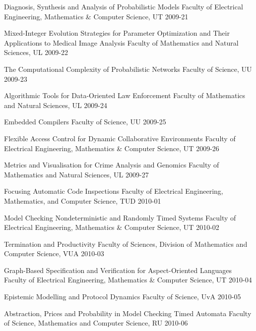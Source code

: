 \begin{multicols}{2}
         {Diagnosis, Synthesis and Analysis of Probabilistic Models}
         {Faculty of Electrical Engineering, Mathematics \& Computer Science, UT}
         {2009-21}

         {Mixed-Integer Evolution Strategies for Parameter Optimization and Their Applications to Medical Image Analysis}
         {Faculty of Mathematics and Natural Sciences, UL}
         {2009-22}

         {The Computational Complexity of Probabilistic Networks}
         {Faculty of Science, UU}
         {2009-23}

         {Algorithmic Tools for Data-Oriented Law Enforcement}
         {Faculty of Mathematics and Natural Sciences, UL}
         {2009-24}

         {Embedded Compilers}
         {Faculty of Science, UU}
         {2009-25}

         {Flexible Access Control for Dynamic Collaborative Environments}
         {Faculty of Electrical Engineering, Mathematics \& Computer Science, UT}
         {2009-26}

         {Metrics and Visualisation for Crime Analysis and Genomics}
         {Faculty of Mathematics and Natural Sciences, UL}
         {2009-27}

         {Focusing Automatic Code Inspections}
         {Faculty of Electrical Engineering, Mathematics, and Computer Science, TUD}
         {2010-01}

         {Model Checking Nondeterministic and Randomly Timed Systems}
         {Faculty of Electrical Engineering, Mathematics \& Computer Science, UT}
         {2010-02}

         {Termination and Productivity}
         {Faculty of Sciences, Division of Mathematics and Computer Science, VUA}
         {2010-03}

         {Graph-Based Specification and Verification for Aspect-Oriented Languages}
         {Faculty of Electrical Engineering, Mathematics \& Computer Science, UT}
         {2010-04}

         {Epistemic Modelling and Protocol Dynamics}
         {Faculty of Science, UvA}
         {2010-05}

         {Abstraction, Prices and Probability in Model Checking Timed Automata}
         {Faculty of Science, Mathematics and Computer Science, RU}
         {2010-06}


\end{multicols}
